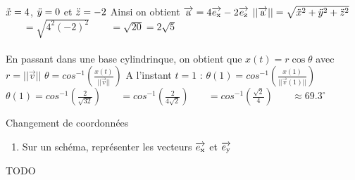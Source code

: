 \documentclass[11pt]{article}
\begin{document}
\begin{app}{}{}
    $\Ddot{x} = 4$, $\Ddot{y} = 0$ et $\Ddot{z} = -2$\n
    Ainsi on obtient $\Vec{a} = 4 \base{x} -2 \base{z}$\n
    $||\Vec{a}|| = \sqrt{\Ddot{x}^{2} + \Ddot{y}^{2} + \Ddot{z}^{2}}$\n
    $~~~~~~~~ = \sqrt{4^{2} (-2)^{2}}$\n
    $~~~~~~~~ = \sqrt{20} = 2\sqrt{5}$\\\\
     En passant dans une base cylindrinque, on obtient que $x(t) = r\cos{\theta}$ avec $r = ||\Vec{v}||$\n
    $\theta = cos^{-1}(\frac{x(t)}{||\Vec{v}||})$\n
    A l'instant $t = 1$ : $\theta(1) = cos^{-1}(\frac{x(1)}{||\Vec{v}(1)||})$\n
    $\theta(1) = cos^{-1}(\frac{2}{\sqrt{32}})$\n
    $~~~~~~~ = cos^{-1}(\frac{2}{4\sqrt{2}})$\n
    $~~~~~~~ = cos^{-1}(\frac{\sqrt{2}}{4})$\n
    $~~~~~~~ \approx 69.3^{\circ}$\n
\end{app}

\begin{app}{Changement de coordonnées}{}
    \begin{enumerate}
        \item Sur un schéma, représenter les vecteurs $\base{x}$ et $\base{y}$
    \end{enumerate}
    \tcblower
     TODO 
\end{app}
\end{document}
